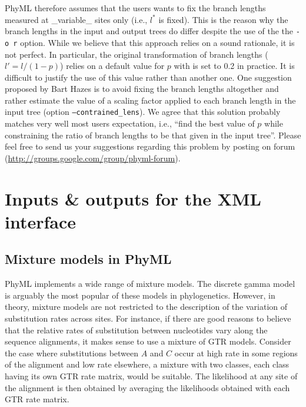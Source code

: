 \documentclass[a4paper,12pt]{article}
\newcommand{\x}[1]{\texttt{#1}}
\begin{document}
PhyML therefore  assumes that the  users wants  to fix the  branch lengths measured  at \_variable\_
sites only  (i.e., $l^{*}$ is  fixed). This is the  reason why the  branch lengths in the  input and
output trees  do differ  despite the  use of the  the \x{-o  r} option. While  we believe  that this
approach relies on a sound rationale, it  is not perfect. In particular, the original transformation
of  branch lengths  ($l' =  l/(1-p)$) relies  on a  default  value for  $p$ with  is set  to 0.2  in
practice. It is difficult  to justify the use of this value rather  than another one. One suggestion
proposed by  Bart Hazes is  to avoid fixing  the branch lengths  altogether and rather  estimate the
value  of   a  scaling  factor   applied  to   each  branch  length   in  the  input   tree  (option
\x{--contrained\_lens}).  We  agree  that  this  solution  probably matches  very  well  most  users
expectation, i.e., ``find the  best value of $p$ while constraining the ratio  of branch lengths to be
that given in the input tree''. Please feel free to send us your suggestions regarding this problem
by posting on forum (\url{http://groups.google.com/group/phyml-forum}).


\section{Inputs \& outputs for the XML interface }\label{sec:xmlio}

\subsection{Mixture models in PhyML}\label{sec:mixtures}

PhyML implements a wide range of mixture models. The discrete gamma model \cite{yang94b} is arguably
the  most popular  of these  models in  phylogenetics. However,  in theory,  mixture models  are not
restricted to the description of the variation  of substitution rates across sites. For instance, if
there are good reasons  to believe that the relative rates of  substitution between nucleotides vary
along the  sequence alignments, it  makes sense to  use a mixture of  GTR models. Consider  the case
where substitutions between $A$ and $C$ occur at  high rate in some regions of the alignment and low
rate elsewhere,  a mixture with two  classes, each class having  its own GTR rate  matrix, would be
suitable. The likelihood at any site of  the alignment is then obtained by averaging the likelihoods
obtained with each GTR rate matrix.
\end{document}
